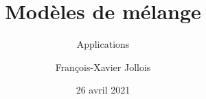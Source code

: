 \documentclass[11pt]{beamer}
\begin{document}
	\author{François-Xavier Jollois}
	\title{Modèles de mélange}
	\subtitle{Applications}
	\date{26 avril 2021}
	\begin{frame}[plain]
		\maketitle
	\end{frame}
	
\end{document}
